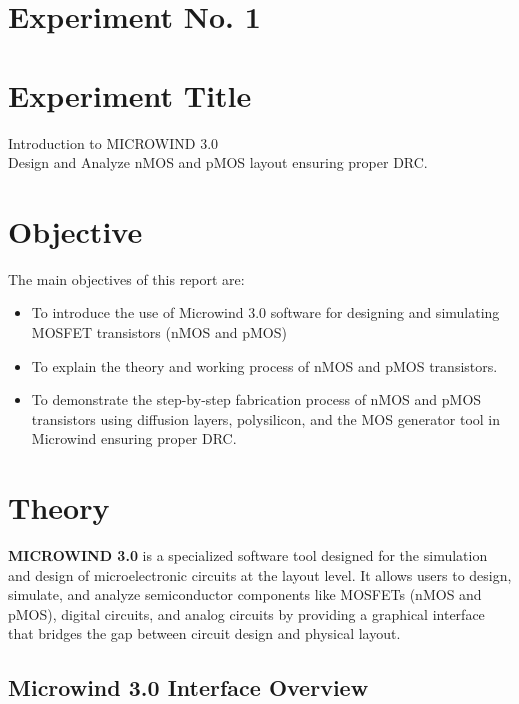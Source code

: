 \documentclass[a4paper,12pt]{article}
\begin{document}
	
	
	
	\section{Experiment No. 1}
	
	\section{Experiment Title }
	Introduction to MICROWIND 3.0\\ Design and Analyze nMOS and pMOS layout ensuring proper DRC.
	\section{Objective}
	The main objectives of this report are:
	\begin{itemize}
		\item To introduce the use of Microwind 3.0 software for designing and simulating MOSFET transistors (nMOS and pMOS)
		\item To explain the theory and working process of nMOS and pMOS transistors.
		\item To demonstrate the step-by-step fabrication process of nMOS and pMOS transistors using diffusion layers, polysilicon, and the MOS generator tool in Microwind ensuring proper DRC.
	\end{itemize}
	\section{Theory}
	\textbf{MICROWIND 3.0} is a specialized software tool designed for the simulation and design of microelectronic circuits at the layout level. It allows users to design, simulate, and analyze semiconductor components like MOSFETs (nMOS and pMOS), digital circuits, and analog circuits by providing a graphical interface that bridges the gap between circuit design and physical layout.
	
	\subsection{Microwind 3.0 Interface Overview}
	
\end{document}
